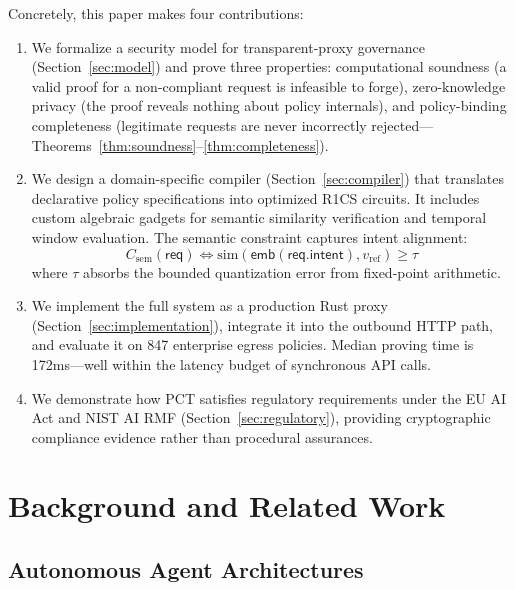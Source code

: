 \documentclass[10pt,conference]{IEEEtran}
\begin{document}
Concretely, this paper makes four contributions:
\begin{enumerate}
    \item We formalize a security model for transparent-proxy governance (Section~\ref{sec:model}) and prove three properties: computational soundness (a valid proof for a non-compliant request is infeasible to forge), zero-knowledge privacy (the proof reveals nothing about policy internals), and policy-binding completeness (legitimate requests are never incorrectly rejected---Theorems~\ref{thm:soundness}--\ref{thm:completeness}).

    \item We design a domain-specific compiler (Section~\ref{sec:compiler}) that translates declarative policy specifications into optimized R1CS circuits. It includes custom algebraic gadgets for semantic similarity verification and temporal window evaluation. The semantic constraint captures intent alignment:
    \[
    C_{\text{sem}}(\mathsf{req}) \iff \text{sim}(\mathsf{emb}(\mathsf{req}.\mathsf{intent}), v_{\text{ref}}) \geq \tau
    \]
    where $\tau$ absorbs the bounded quantization error from fixed-point arithmetic.

    \item We implement the full system as a production Rust proxy (Section~\ref{sec:implementation}), integrate it into the outbound HTTP path, and evaluate it on 847 enterprise egress policies. Median proving time is 172ms---well within the latency budget of synchronous API calls.

    \item We demonstrate how PCT satisfies regulatory requirements under the EU AI Act and NIST AI RMF (Section~\ref{sec:regulatory}), providing cryptographic compliance evidence rather than procedural assurances.
\end{enumerate}

\section{Background and Related Work}
\label{sec:related}

\subsection{Autonomous Agent Architectures}
\end{document}
